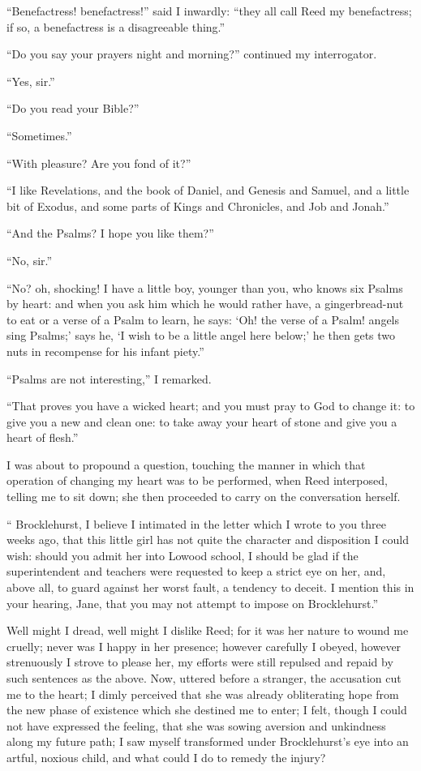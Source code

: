 \enquote{Benefactress! benefactress!} said I inwardly: \enquote{they all
call \Mrs{} Reed my benefactress; if so, a benefactress is a disagreeable
thing.}

\enquote{Do you say your prayers night and morning?} continued my
interrogator.

\enquote{Yes, sir.}

\enquote{Do you read your Bible?}

\enquote{Sometimes.}

\enquote{With pleasure? Are you fond of it?}

\enquote{I like Revelations, and the book of Daniel, and Genesis and
Samuel, and a little bit of Exodus, and some parts of Kings and
Chronicles, and Job and Jonah.}

\enquote{And the Psalms? I hope you like them?}

\enquote{No, sir.}

\enquote{No? oh, shocking! I have a little boy, younger than you, who
knows six Psalms by heart: and when you ask him which he would rather
have, a gingerbread-nut to eat or a verse of a Psalm to learn, he says:
\enquote{Oh! the verse of a Psalm! angels sing Psalms;} says he,
\enquote{I wish to be a little angel here below;} he then gets two nuts
in recompense for his infant piety.}

\enquote{Psalms are not interesting,} I remarked.

\enquote{That proves you have a wicked heart; and you must pray to God
to change it: to give you a new and clean one: to take away your heart
of stone and give you a heart of flesh.}

I was about to propound a question, touching the manner in which that
operation of changing my heart was to be performed, when \Mrs{} Reed
interposed, telling me to sit down; she then proceeded to carry on the
conversation herself.

\enquote{\Mr{} Brocklehurst, I believe I intimated in the letter which I
wrote to you three weeks ago, that this little girl has not quite the
character and disposition I could wish: should you admit her into Lowood
school, I should be glad if the superintendent and teachers were
requested to keep a strict eye on her, and, above all, to guard against
her worst fault, a tendency to deceit. I mention this in your hearing,
Jane, that you may not attempt to impose on \Mr{} Brocklehurst.}

Well might I dread, well might I dislike \Mrs{} Reed; for it was her
nature to wound me cruelly; never was I happy in her presence; however
carefully I obeyed, however strenuously I strove to please her, my
efforts were still repulsed and repaid by such sentences as the above. 
Now, uttered before a stranger, the accusation cut me to the heart; I
dimly perceived that she was already obliterating hope from the new
phase of existence which she destined me to enter; I felt, though I
could not have expressed the feeling, that she was sowing aversion and
unkindness along my future path; I saw myself transformed under \Mr{}
Brocklehurst's eye into an artful, noxious child, and what could I do to
remedy the injury?

